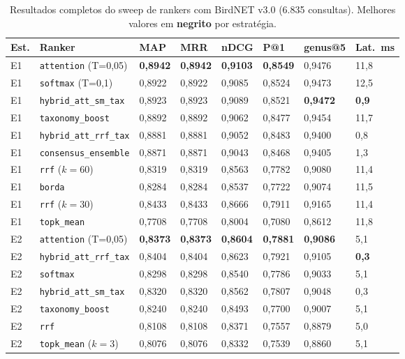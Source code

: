 \documentclass[12pt,a4paper]{article}
\begin{document}
\begin{table}[htbp]
\centering
\caption{Resultados completos do sweep de rankers com BirdNET v3.0 (6.835 consultas).
Melhores valores em \textbf{negrito} por estratégia.}
\label{tab:sweep_birdnet}
\begin{tabular}{L{1.0cm}L{3.5cm}C{1.3cm}C{1.3cm}C{1.3cm}C{1.2cm}C{1.3cm}C{1.3cm}}
\toprule
\textbf{Est.} & \textbf{Ranker} & \textbf{MAP} & \textbf{MRR} & \textbf{nDCG} & \textbf{P@1} & \textbf{genus@5} & \textbf{Lat.\ ms} \\
\midrule
E1 & \texttt{attention} (T=0,05) & \textbf{0,8942} & \textbf{0,8942} & \textbf{0,9103} & \textbf{0,8549} & 0,9476 & 11,8 \\
E1 & \texttt{softmax} (T=0,1) & 0,8922 & 0,8922 & 0,9085 & 0,8524 & 0,9473 & 12,5 \\
E1 & \texttt{hybrid\_att\_sm\_tax} & 0,8923 & 0,8923 & 0,9089 & 0,8521 & \textbf{0,9472} & \textbf{0,9} \\
E1 & \texttt{taxonomy\_boost} & 0,8892 & 0,8892 & 0,9062 & 0,8477 & 0,9454 & 11,7 \\
E1 & \texttt{hybrid\_att\_rrf\_tax} & 0,8881 & 0,8881 & 0,9052 & 0,8483 & 0,9400 & 0,8 \\
E1 & \texttt{consensus\_ensemble} & 0,8871 & 0,8871 & 0,9043 & 0,8468 & 0,9405 & 1,3 \\
E1 & \texttt{rrf} ($k=60$) & 0,8319 & 0,8319 & 0,8563 & 0,7782 & 0,9080 & 11,4 \\
E1 & \texttt{borda} & 0,8284 & 0,8284 & 0,8537 & 0,7722 & 0,9074 & 11,5 \\
E1 & \texttt{rrf} ($k=30$) & 0,8433 & 0,8433 & 0,8666 & 0,7911 & 0,9165 & 11,4 \\
E1 & \texttt{topk\_mean} & 0,7708 & 0,7708 & 0,8004 & 0,7080 & 0,8612 & 11,8 \\
\midrule
E2 & \texttt{attention} (T=0,05) & \textbf{0,8373} & \textbf{0,8373} & \textbf{0,8604} & \textbf{0,7881} & \textbf{0,9086} & 5,1 \\
E2 & \texttt{hybrid\_att\_rrf\_tax} & 0,8404 & 0,8404 & 0,8623 & 0,7921 & 0,9105 & \textbf{0,3} \\
E2 & \texttt{softmax} & 0,8298 & 0,8298 & 0,8540 & 0,7786 & 0,9033 & 5,1 \\
E2 & \texttt{hybrid\_att\_sm\_tax} & 0,8320 & 0,8320 & 0,8562 & 0,7807 & 0,9048 & 0,3 \\
E2 & \texttt{taxonomy\_boost} & 0,8240 & 0,8240 & 0,8493 & 0,7700 & 0,9007 & 5,1 \\
E2 & \texttt{rrf} & 0,8108 & 0,8108 & 0,8371 & 0,7557 & 0,8879 & 5,0 \\
E2 & \texttt{topk\_mean} ($k=3$) & 0,8076 & 0,8076 & 0,8332 & 0,7539 & 0,8860 & 5,1 \\
\bottomrule
\end{tabular}
\end{table}
\end{document}
